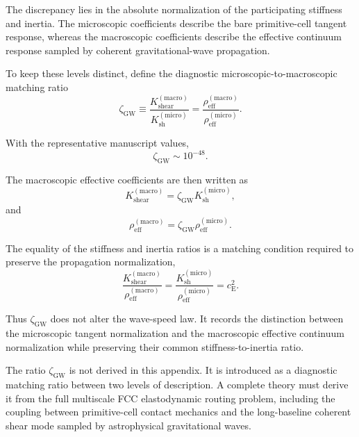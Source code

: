 The discrepancy lies in the absolute normalization of the participating stiffness and inertia. The microscopic coefficients describe the bare primitive-cell tangent response, whereas the macroscopic coefficients describe the effective continuum response sampled by coherent gravitational-wave propagation.

To keep these levels distinct, define the diagnostic microscopic-to-macroscopic matching ratio
\begin{equation}
    \boxed{ \zeta_{\mathrm{GW}} \equiv \frac{ K_{\mathrm{shear}}^{(\mathrm{macro})} }{ K_{\mathrm{sh}}^{(\mathrm{micro})} } = \frac{ \rho_{\mathrm{eff}}^{(\mathrm{macro})} }{ \rho_{\mathrm{eff}}^{(\mathrm{micro})} } }.
\end{equation}

With the representative manuscript values,
\begin{equation}
    \zeta_{\mathrm{GW}} \sim 10^{-48}.
\end{equation}

The macroscopic effective coefficients are then written as
\begin{equation}
    K_{\mathrm{shear}}^{(\mathrm{macro})} = \zeta_{\mathrm{GW}} K_{\mathrm{sh}}^{(\mathrm{micro})},
\end{equation}
and
\begin{equation}
    \rho_{\mathrm{eff}}^{(\mathrm{macro})} = \zeta_{\mathrm{GW}} \rho_{\mathrm{eff}}^{(\mathrm{micro})}.
\end{equation}

The equality of the stiffness and inertia ratios is a matching condition required to preserve the propagation normalization,
\begin{equation}
    \frac{ K_{\mathrm{shear}}^{(\mathrm{macro})} }{ \rho_{\mathrm{eff}}^{(\mathrm{macro})} } = \frac{ K_{\mathrm{sh}}^{(\mathrm{micro})} }{ \rho_{\mathrm{eff}}^{(\mathrm{micro})} } = c_{\mathrm{E}}^2.
\end{equation}

Thus $\zeta_{\mathrm{GW}}$ does not alter the wave-speed law. It records the distinction between the microscopic tangent normalization and the macroscopic effective continuum normalization while preserving their common stiffness-to-inertia ratio.

The ratio $\zeta_{\mathrm{GW}}$ is not derived in this appendix. It is introduced as a diagnostic matching ratio between two levels of description. A complete theory must derive it from the full multiscale FCC elastodynamic routing problem, including the coupling between primitive-cell contact mechanics and the long-baseline coherent shear mode sampled by astrophysical gravitational waves.

